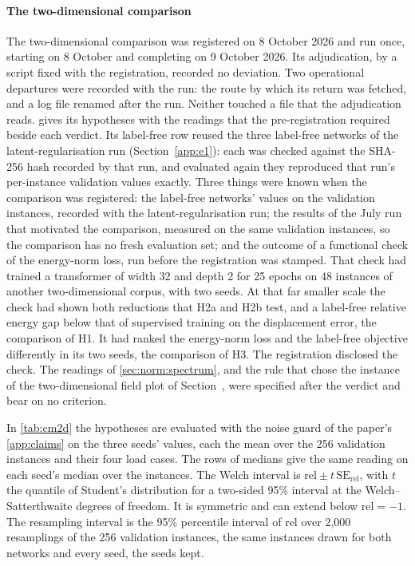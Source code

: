\paragraph{The two-dimensional comparison}
The two-dimensional comparison was registered on 8 October 2026 and run once, starting on 8
October and completing on 9 October 2026. Its adjudication, by a script fixed with the registration,
recorded no deviation. Two operational departures were recorded with the run: the route
by which its return was fetched, and a log file renamed after the run. Neither touched a
file that the adjudication reads.  gives its hypotheses with the readings
that the pre-registration required beside each verdict. Its label-free row reused the three
label-free networks of the latent-regularisation run (Section~\ref{app:e1}): each was
checked against the SHA-256 hash recorded by that run, and evaluated again they reproduced
that run's per-instance validation values exactly. Three things were known when the
comparison was registered: the label-free networks' values on the validation instances,
recorded with the latent-regularisation run; the results of the July run that motivated the
comparison, measured on the same validation instances, so the comparison has no fresh
evaluation set; and the outcome of a functional check of the energy-norm loss, run before the registration was
stamped. That check had trained a transformer of width 32 and depth 2 for 25
epochs on 48 instances of another two-dimensional corpus, with two seeds. At that far
smaller scale the check had shown both reductions that H2a and H2b test, and a label-free
relative energy gap below that of supervised training on the displacement error, the comparison of H1. It had ranked the energy-norm loss and the label-free objective
differently in its two seeds, the comparison of H3. The registration disclosed the check. The readings
of \cref{sec:norm:spectrum}, and the rule that chose the instance of the two-dimensional
field plot of Section~\SuppTwo{}, were specified after the verdict and bear on no criterion.

In \cref{tab:cm2d} the hypotheses are evaluated with the noise guard of the paper's
\ref{app:claims} on the three seeds' values, each the mean over the 256 validation instances and their four load cases. The rows of medians give the same reading on each
seed's median over the instances. The Welch interval is
$\mathrm{rel}\pm t\,\mathrm{SE}_{\mathrm{rel}}$, with $t$ the quantile of Student's
distribution for a two-sided 95\% interval at the Welch--Satterthwaite degrees of freedom. It is symmetric and can extend below $\mathrm{rel}=-1$. The resampling interval is the 95\%
percentile interval of $\mathrm{rel}$ over 2,000 resamplings of the 256 validation
instances, the same instances drawn for both networks and every seed, the seeds kept.

